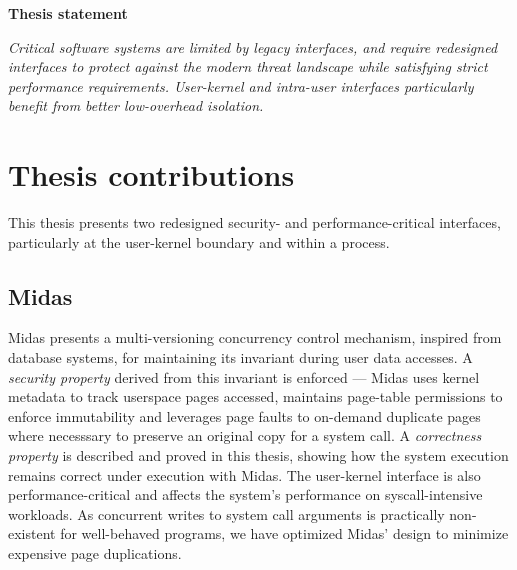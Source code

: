 \begin{center}
      \textbf{Thesis statement}


\emph{
      Critical software systems are limited by legacy interfaces, 
      and require redesigned interfaces to protect against the modern 
      threat landscape while satisfying strict performance requirements.
      User-kernel and intra-user interfaces particularly benefit from 
      better low-overhead isolation.
}
\end{center}

\section{Thesis contributions}

This thesis presents two redesigned security- and performance-critical 
interfaces, particularly at the user-kernel boundary and within a process.

\subsection{Midas}
Midas presents a multi-versioning concurrency control mechanism, inspired
from database systems, for maintaining its invariant during user data
accesses.
A \emph{security property} derived from this invariant is enforced ---
Midas uses kernel metadata to track userspace pages accessed, maintains
page-table permissions to enforce immutability and leverages page faults
to on-demand duplicate pages where necesssary to preserve an original
copy for a system call.
A \emph{correctness property} is described and proved in this thesis,
showing how the system execution remains correct under execution with
Midas.
The user-kernel interface is also performance-critical and affects the
system's performance on syscall-intensive workloads.
As concurrent writes to system call arguments is practically non-existent
for well-behaved programs, we have optimized Midas' design to minimize 
expensive page duplications.


